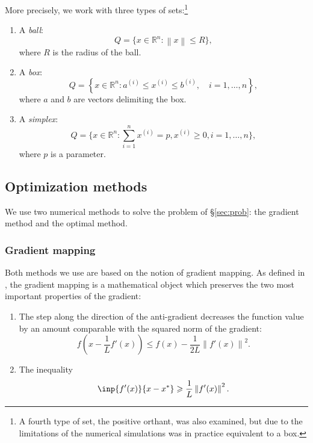 \documentclass[final]{aomart}
\newtheorem[{}\it]{thm}{Theorem}[section]
\theoremstyle{definition}
\newtheorem*[{}\it]{notation}{Notation}
\numberwithin{equation}{section}
\newcommand{\secref}[1]{\S\ref{#1}}
\newcommand{\enVert}[1]{\left\lVert#1\right\rVert}
\let\norm=\enVert
\begin{document}
More precisely, we work with three types of sets:\footnote{A fourth type of set, the positive orthant, was also examined, but due to the limitations of the numerical simulations was in practice equivalent to a box.}
\begin{enumerate}
	\item A \emph{ball}:
	\begin{equation}
	Q = \{x \in \mathbb{R}^n: \norm{x} \leqslant R\},
	\end{equation}
	where \(R\) is the radius of the ball.
	\item A \emph{box}:
	\begin{equation}
	Q = \left\{x \in \mathbb{R}^n: a^{(i)} \leqslant x^{(i)} \leqslant b^{(i)},\quad i = 1, \dots, n\right\},
	\end{equation}
	where \(a\) and \(b\) are vectors delimiting the box.
	\item A \emph{simplex}:
	\begin{equation}
	Q = \{x \in \mathbb{R}^n: \sum_{i=1}^n x^{(i)} = p, x^{(i)} \geqslant 0, i = 1, \dots, n\},
	\end{equation}
	where \(p\) is a parameter.
\end{enumerate}

\subsection{Optimization methods}
We use two numerical methods to solve the problem of \secref{sec:prob}: the gradient method and the optimal method.

\subsubsection{Gradient mapping}
Both methods we use are based on the notion of gradient mapping.
As defined in \cite{Nesterov2018}, the gradient mapping is a mathematical object which preserves the two most important properties of the gradient:
\begin{enumerate}
	\item The step along the direction of the anti-gradient decreases the function value by an amount comparable with the squared norm of the gradient:
	\begin{equation}
	f\left(x - \frac{1}{L} f'(x) \right) \leqslant f(x) - \frac{1}{2L} \norm{f'(x)}^2.
	\end{equation}
	\item The inequality
	\begin{equation}
	\inp{f'(x)}{x - x^*} \geqslant \frac{1}{L} \norm{f'(x)}^2.
	\end{equation}
\end{enumerate}
\end{document}
